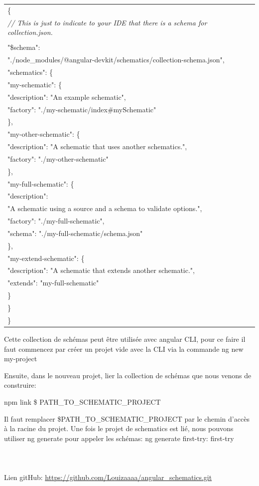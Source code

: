 \documentclass[12pt,french]{article}
\begin{document}
	\begin{tabular}{l}
		\{\\
			\textit{// This is just to indicate to your IDE that there is a schema for collection.json.}\\
			\\
			\quad"\$schema":\\ \quad"./node\_modules/@angular-devkit/schematics/collection-schema.json",\\
			\quad"schematics": \{\\
				\qquad"my-schematic": \{\\
					\qquad\quad"description": "An example schematic",\\
					\qquad\quad"factory": "./my-schematic/index\#mySchematic"\\
				\qquad\},\\
				\qquad"my-other-schematic": \{\\
					\qquad\quad"description": "A schematic that uses another schematics.",\\
					\qquad\quad"factory": "./my-other-schematic"\\
				\qquad\},\\
				\qquad"my-full-schematic": \{\\
					\qquad\quad"description": \\
					\qquad\quad"A schematic using a source and a schema to validate options.",\\
					\qquad\quad"factory": "./my-full-schematic",\\
					\qquad\quad"schema": "./my-full-schematic/schema.json"\\
				\qquad\},\\
				\qquad"my-extend-schematic": \{\\
					\qquad\quad"description": "A schematic that extends another schematic.",\\
					\qquad\quad"extends": "my-full-schematic"\\
				\qquad\}\\
			\quad\}\\
		\}\\
	\end{tabular}\break

	Cette collection de schémas peut être utilisée avec angular CLI, pour ce faire il faut commencez par créer un projet vide avec la CLI via la commande\newline		
	 ng new my-project\newpage
	
	Ensuite, dans le nouveau projet, lier la collection de schémas que nous venons de construire:
\newline
	
	npm link \$ PATH\_TO\_SCHEMATIC\_PROJECT\newline 
	
	Il faut remplacer \$PATH\_TO\_SCHEMATIC\_PROJECT par le chemin d'accès à la racine du projet. 
	Une fois le projet de schematics est lié, nous pouvons utiliser ng generate pour appeler les schémas:\newline	
	ng generate first-try: first-try 
	\\\\
	\\
	\\
Lien gitHub: \url{https://github.com/Louizaaaa/angular_schematics.git}	
	
\end{document}
